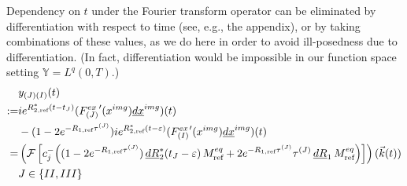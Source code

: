 \documentclass{ws-m3as}
\newcommand{\uld}[1]{\underline{d#1}}
\newcommand\taup{\varepsilon}
\newcommand\tauone{\tau^{(II)}}
\newcommand\tautwo{\tau^{(III)}}
\newcommand\tII{t_{II}}
\newcommand\tIII{t_{III}}
\begin{document}
Dependency on $t$ under the Fourier transform operator can be eliminated by differentiation with respect to time 
(see, e.g., the appendix), 
or by taking combinations of these values, as we do here in order to avoid ill-posedness due to differentiation. (In fact, differentiation would be impossible in our function space setting $\mathbb{Y}=L^q(0,T)$.)
\begin{equation}\label{R1fromF}
\begin{aligned}
&y_{(J)(I)}(t)\\
:=&ie^{R_{2,\text{ref}}^*(t-t_J)}({F_{(J)}^{ex}}'(x^{img})\uld{x}^{img})(t)\\
&-(1-2e^{-R_{1,\text{ref}}\tau^{(J)}})ie^{R_{2,\text{ref}}^*(t-\taup)}({F_{(I)}^{ex}}'(x^{img})\uld{x}^{img})(t)\\
=&
\left(\mathcal{F}\left[c^-_j
\Bigl((1-2e^{-R_{1,\text{ref}}\tau^{(J)}})\,\uld{R}_2^*(t_J-\taup)\,M^{eq}_{\text{ref}}
+2 e^{-R_{1,\text{ref}}\tau^{(J)}}\tau^{(J)}\,\uld{R}_1\,M^{eq}_{\text{ref}} \Bigr)\right]\right) ({\vec k}(t))
\\
&J\in\{II,III\}
\end{aligned}
\end{equation}

\end{document}
